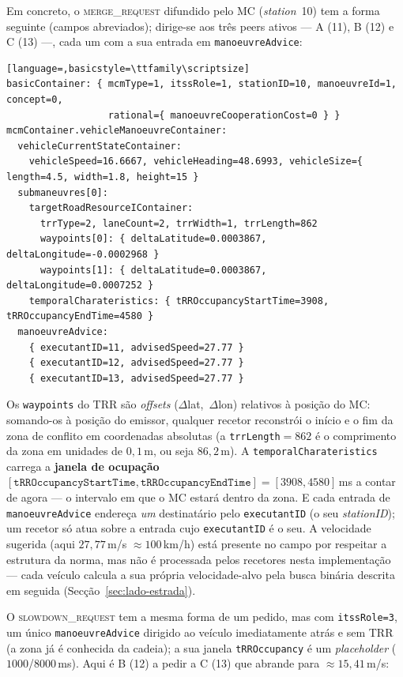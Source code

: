 \documentclass[11pt,a4paper]{article}
\begin{document}
Em concreto, o \textsc{merge\_request} difundido pelo MC (\emph{station}~10) tem a forma
seguinte (campos abreviados); dirige-se aos três peers ativos --- A (11), B (12) e C (13)
---, cada um com a sua entrada em \texttt{manoeuvreAdvice}:

\begin{lstlisting}[language=,basicstyle=\ttfamily\scriptsize]
basicContainer: { mcmType=1, itssRole=1, stationID=10, manoeuvreId=1, concept=0,
                  rational={ manoeuvreCooperationCost=0 } }
mcmContainer.vehicleManoeuvreContainer:
  vehicleCurrentStateContainer:
    vehicleSpeed=16.6667, vehicleHeading=48.6993, vehicleSize={ length=4.5, width=1.8, height=15 }
  submaneuvres[0]:
    targetRoadResourceIContainer:
      trrType=2, laneCount=2, trrWidth=1, trrLength=862
      waypoints[0]: { deltaLatitude=0.0003867, deltaLongitude=-0.0002968 }
      waypoints[1]: { deltaLatitude=0.0003867, deltaLongitude=0.0007252 }
    temporalCharateristics: { tRROccupancyStartTime=3908, tRROccupancyEndTime=4580 }
  manoeuvreAdvice:
    { executantID=11, advisedSpeed=27.77 }
    { executantID=12, advisedSpeed=27.77 }
    { executantID=13, advisedSpeed=27.77 }
\end{lstlisting}

Os \texttt{waypoints} do TRR são \emph{offsets} ($\Delta$lat,~$\Delta$lon) relativos à
posição do MC: somando-os à posição do emissor, qualquer recetor reconstrói o início e o
fim da zona de conflito em coordenadas absolutas (a \texttt{trrLength}$=862$ é o comprimento
da zona em unidades de $0{,}1$\,m, ou seja $86{,}2$\,m). A \texttt{temporalCharateristics}
carrega a \textbf{janela de ocupação}
$[\texttt{tRROccupancyStartTime},\texttt{tRROccupancyEndTime}]=[3908,4580]$\,ms a contar de
agora --- o intervalo em que o MC estará dentro da zona. E cada entrada de
\texttt{manoeuvreAdvice} endereça \emph{um} destinatário pelo \texttt{executantID} (o seu
\emph{stationID}); um recetor só atua sobre a entrada cujo \texttt{executantID} é o seu.
A velocidade sugerida (aqui $27{,}77$\,m/s $\approx100$\,km/h) está presente no campo por
respeitar a estrutura da norma, mas não é processada pelos recetores nesta implementação
--- cada veículo calcula a sua própria velocidade-alvo pela busca binária descrita em
seguida (Secção~\ref{sec:lado-estrada}).

O \textsc{slowdown\_request} tem a mesma forma de um pedido, mas com \texttt{itssRole=3}, um
único \texttt{manoeuvreAdvice} dirigido ao veículo imediatamente atrás e sem TRR (a zona já
é conhecida da cadeia); a sua janela \texttt{tRROccupancy} é um \emph{placeholder}
($1000$/$8000$\,ms). Aqui é B (12) a pedir a C (13) que abrande para $\approx 15{,}41$\,m/s:
\end{document}
